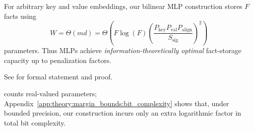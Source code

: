 \begin{corollary}\label{cor:optimal-fact-storage-capacity-arb}
For arbitrary key and value embeddings, our bilinear MLP construction stores $F$ facts using 
\[
W = \Theta(md) = \Theta\!\left(F\log(F)\left(\frac{ P_{\mathrm{key}} P_{\mathrm{val}} P_{\mathrm{align}} }{S_{\mathrm{sig}}}\right)^2\right)
\]
parameters.
Thus MLPs achieve \emph{information-theoretically optimal} fact-storage capacity up to penalization factors.
\end{corollary}
See  for formal statement and proof.


 counts real-valued parameters; Appendix~\ref{app:theory:margin_bounds:bit_complexity} shows that, under bounded precision, our construction incurs only an extra logarithmic factor in total bit complexity.



